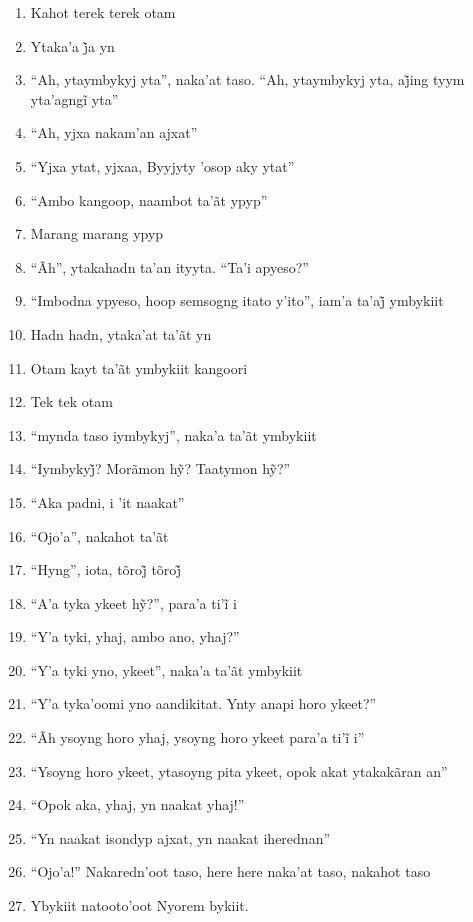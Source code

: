 \begin{enumerate}
 \item Kahot terek terek otam
 \item Ytaka’a j̃a yn
 \item ``Ah, ytaymbykyj yta'', naka’at taso. ``Ah, ytaymbykyj yta, aj̃ing tyym yta’agngĩ yta''
 \item ``Ah, yjxa nakam'an ajxat''
 \item ``Yjxa ytat, yjxaa, Byyjyty 'osop aky ytat''
 \item ``Ambo kangoop, naambot ta'ãt ypyp''
 \item Marang marang ypyp
 \item ``Ãh'', ytakahadn ta'an ityyta. ``Ta'i apyeso?''
 \item ``Imbodna ypyeso, hoop semsogng itato y’ito'', iam’a ta’aj̃ ymbykiit
 \begin{center}\end{center}
 \item Hadn hadn, ytaka'at ta'ãt yn
 \item Otam kayt ta'ãt ymbykiit kangoori
 \item Tek tek otam
 \item ``mynda taso iymbykyj'', naka'a ta'ãt ymbykiit
 \item ``Iymbykyj̃? Morãmon hỹ? Taatymon hỹ?''
 \item ``Aka padni, i 'it naakat''
 \item ``Ojo'a'', nakahot ta'ãt
 \item ``Hyng'', iota, tõroj̃ tõroj̃
 \item ``A’a tyka ykeet hỹ?'', para’a ti’ĩ i
 \item ``Y'a tyki, yhaj, ambo ano, yhaj?''
 \item ``Y'a tyki yno, ykeet'', naka'a ta'ãt ymbykiit
 \item ``Y'a tyka'oomi yno aandikitat. Ynty anapi horo ykeet?''
 \item ``Ãh ysoyng horo yhaj, ysoyng horo ykeet para’a ti’ĩ i''
 \item ``Ysoyng horo ykeet, ytasoyng pita ykeet, opok akat ytakakãran an''
 \item``Opok aka, yhaj, yn naakat yhaj!''
 \item ``Yn naakat isondyp ajxat, yn naakat iherednan''
 \item ``Ojo'a!'' Nakaredn'oot taso, here here naka'at taso, nakahot taso
 \begin{center}\end{center}
 \item Ybykiit natooto'oot Nyorem bykiit.

\end{enumerate}
